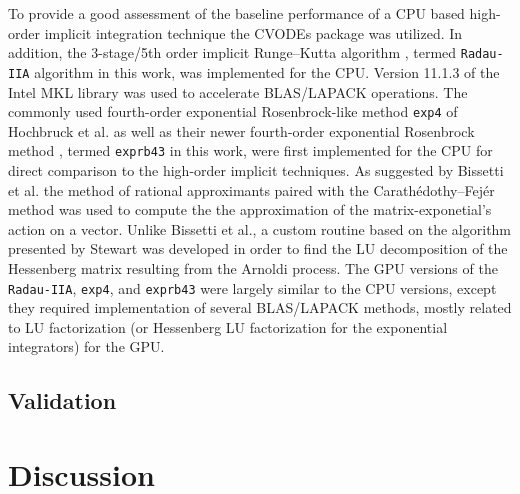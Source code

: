 \documentclass[preprint,12pt]{elsarticle}
\begin{document}
To provide a good assessment of the baseline performance of a CPU based high-order implicit integration technique the CVODEs package \cite{Hindmarsh:2005hg} was utilized.
In addition, the 3-stage/5th order implicit Runge--Kutta algorithm \cite{hairer1996solving}, termed \texttt{Radau-IIA} algorithm in this work, was implemented for the CPU.
Version 11.1.3 of the Intel MKL library was used to accelerate BLAS/LAPACK operations.
The commonly used fourth-order exponential Rosenbrock-like method \texttt{exp4} of Hochbruck et al. \cite{Hochbruck:1998} as well as their newer fourth-order exponential Rosenbrock method \cite{Hockbruck:2009}, termed \texttt{exprb43} in this work, were first implemented for the CPU for direct comparison to the high-order implicit techniques.
As suggested by Bissetti et al. \cite{Bisetti:2012jw} the method of rational approximants \cite{gallopoulos:1992} paired with the Carath\'edothy--Fej\'er method \cite{trefethen:2006} was used to compute the the approximation of the matrix-exponetial's action on a vector.
Unlike Bissetti et al., a custom routine based on the algorithm presented by Stewart \cite{stewart:1998} was developed in order to find the LU decomposition of the Hessenberg matrix resulting from the Arnoldi process.
The GPU versions of the \texttt{Radau-IIA}, \texttt{exp4}, and \texttt{exprb43} were largely similar to the CPU versions, except they required implementation of several BLAS/LAPACK methods, mostly related to LU factorization (or Hessenberg LU factorization for the exponential integrators) for the GPU.


\subsection{Validation}

\section{Discussion}


\pagebreak



\end{document}

